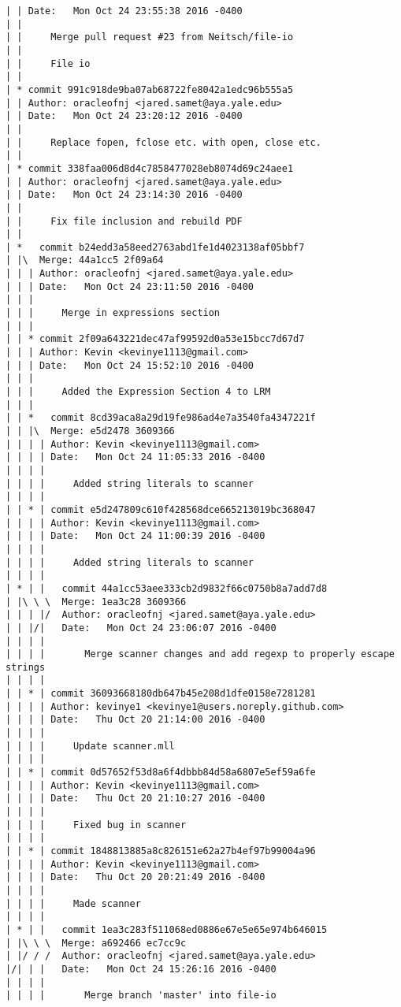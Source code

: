 \begin{lstlisting}
| | Date:   Mon Oct 24 23:55:38 2016 -0400
| | 
| |     Merge pull request #23 from Neitsch/file-io
| |     
| |     File io
| |   
| * commit 991c918de9ba07ab68722fe8042a1edc96b555a5
| | Author: oracleofnj <jared.samet@aya.yale.edu>
| | Date:   Mon Oct 24 23:20:12 2016 -0400
| | 
| |     Replace fopen, fclose etc. with open, close etc.
| |   
| * commit 338faa006d8d4c7858477028eb8074d69c24aee1
| | Author: oracleofnj <jared.samet@aya.yale.edu>
| | Date:   Mon Oct 24 23:14:30 2016 -0400
| | 
| |     Fix file inclusion and rebuild PDF
| |     
| *   commit b24edd3a58eed2763abd1fe1d4023138af05bbf7
| |\  Merge: 44a1cc5 2f09a64
| | | Author: oracleofnj <jared.samet@aya.yale.edu>
| | | Date:   Mon Oct 24 23:11:50 2016 -0400
| | | 
| | |     Merge in expressions section
| | |    
| | * commit 2f09a643221dec47af99592d0a53e15bcc7d67d7
| | | Author: Kevin <kevinye1113@gmail.com>
| | | Date:   Mon Oct 24 15:52:10 2016 -0400
| | | 
| | |     Added the Expression Section 4 to LRM
| | |      
| | *   commit 8cd39aca8a29d19fe986ad4e7a3540fa4347221f
| | |\  Merge: e5d2478 3609366
| | | | Author: Kevin <kevinye1113@gmail.com>
| | | | Date:   Mon Oct 24 11:05:33 2016 -0400
| | | | 
| | | |     Added string literals to scanner
| | | |     
| | * | commit e5d247809c610f428568dce665213019bc368047
| | | | Author: Kevin <kevinye1113@gmail.com>
| | | | Date:   Mon Oct 24 11:00:39 2016 -0400
| | | | 
| | | |     Added string literals to scanner
| | | |       
| * | |   commit 44a1cc53aee333cb2d9832f66c0750b8a7add7d8
| |\ \ \  Merge: 1ea3c28 3609366
| | | |/  Author: oracleofnj <jared.samet@aya.yale.edu>
| | |/|   Date:   Mon Oct 24 23:06:07 2016 -0400
| | | |   
| | | |       Merge scanner changes and add regexp to properly escape strings
| | | |     
| | * | commit 36093668180db647b45e208d1dfe0158e7281281
| | | | Author: kevinye1 <kevinye1@users.noreply.github.com>
| | | | Date:   Thu Oct 20 21:14:00 2016 -0400
| | | | 
| | | |     Update scanner.mll
| | | |     
| | * | commit 0d57652f53d8a6f4dbbb84d58a6807e5ef59a6fe
| | | | Author: Kevin <kevinye1113@gmail.com>
| | | | Date:   Thu Oct 20 21:10:27 2016 -0400
| | | | 
| | | |     Fixed bug in scanner
| | | |     
| | * | commit 1848813885a8c826151e62a27b4ef97b99004a96
| | | | Author: Kevin <kevinye1113@gmail.com>
| | | | Date:   Thu Oct 20 20:21:49 2016 -0400
| | | | 
| | | |     Made scanner
| | | |       
| * | |   commit 1ea3c283f511068ed0886e67e5e65e974b646015
| |\ \ \  Merge: a692466 ec7cc9c
| |/ / /  Author: oracleofnj <jared.samet@aya.yale.edu>
|/| | |   Date:   Mon Oct 24 15:26:16 2016 -0400
| | | |   
| | | |       Merge branch 'master' into file-io

\end{lstlisting}

